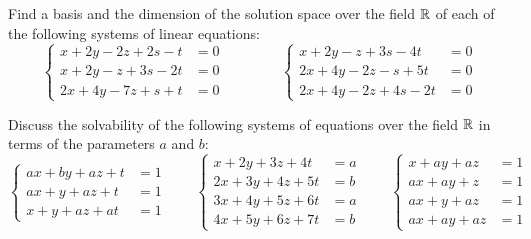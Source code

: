 \begin{exercise}
Find a basis and the dimension of the solution space over the field $\mathbb{R}$ of each of the following systems
of linear equations:
\[
\left\{ \begin{aligned}
x + 2y - 2z + 2s - t &= 0\\
x + 2y - z + 3s - 2t &= 0\\
2x + 4y - 7z + s + t &= 0
\end{aligned} \right.
\qquad\qquad
\left\{ \begin{aligned}
x + 2y - z + 3s - 4t &= 0\\
2x + 4y - 2z - s + 5t &= 0\\
2x + 4y - 2z + 4s - 2t &= 0
\end{aligned} \right.
\]
\end{exercise}

\begin{exercise}
Discuss the solvability of the following systems of equations over the field $\mathbb{R}$ in terms of the
parameters $a$ and $b$:
\[
\left\{ \begin{aligned}
ax + by + az + t &= 1\\
ax + y + az + t &= 1\\
x + y + az + at &= 1
\end{aligned} \right.
\qquad
\left\{ \begin{aligned}
x + 2y + 3z + 4t &= a\\
2x + 3y + 4z + 5t &= b\\
3x + 4y + 5z + 6t &= a\\
4x + 5y + 6z + 7t &= b
\end{aligned} \right.
\qquad
\left\{ \begin{aligned}
x + ay + az &= 1\\
ax + ay + z &= 1\\
ax + y + az &= 1\\
ax + ay + az &= 1
\end{aligned} \right.
\]
\end{exercise}

